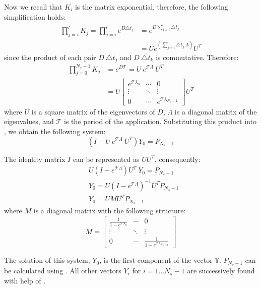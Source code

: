 Now we recall that $K_i$ is the matrix exponential, therefore, the following simplification holds:
\begin{align*}
  \prod_{j = i}^l K_j = \prod_{j = i}^l e^{D \triangle t_j} & = e^{D \sum_{j = i}^l \triangle t_j} \\
  & = U e^{\left( \sum_{j = i}^l \triangle t_j \: \Lambda \right)} U^T
\end{align*}
since the product of each pair $D \: \triangle t_j$ and $D \: \triangle t_k$ is commutative. Therefore:
\begin{align*}
  \prod_{j = 0}^{N_s - 1} K_j & = e^{D \mathcal{T}} = U \: e^{\mathcal{T} \Lambda} \: U^T \\
    & = U \left[
      \begin{array}{ccc}
        e^{\mathcal{T} \lambda_0} & \cdots & 0 \\
        \vdots & \ddots & \vdots \\
        0 & \cdots & e^{\mathcal{T} \lambda_{N_n - 1}}
      \end{array}
    \right] U^T
\end{align*}
where $U$ is a square matrix of the eigenvectors of $D$, $\Lambda$ is a diagonal matrix of the eigenvalues, and $\mathcal{T}$ is the period of the application. Substituting this product into , we obtain the following system:
\[
  (I - U \: e^{\mathcal{T} \Lambda} \: U^T) Y_0 = P_{N_s - 1}
\]

The identity matrix $I$ can be represented as $U U^T$, consequently:
\begin{align*}
  & U (I - e^{\mathcal{T} \Lambda}) U^T \: Y_0 = P_{N_s - 1} \\
  & Y_0 = U (I - e^{\mathcal{T} \Lambda})^{-1} U^T P_{N_s - 1} \\
  & Y_0 = U M U^T P_{N_s - 1}
\end{align*}
where $M$ is a diagonal matrix with the following structure:
\[
  M = \left[
    \begin{array}{ccc}
      \frac{1}{1 - e^{\mathcal{T} \lambda_0}} & \cdots & 0 \\
      \vdots & \ddots & \vdots \\
      0 & \cdots & \frac{1}{1 - e^{\mathcal{T} \lambda_{N_n - 1}}}
    \end{array}
  \right]
\]

The solution of this system, $Y_0$, is the first component of the vector $\mathbb{Y}$. $P_{N_s - 1}$ can be calculated using . All other vectors $Y_i$ for $i = 1 \dots N_s - 1$ are successively found with help of .

